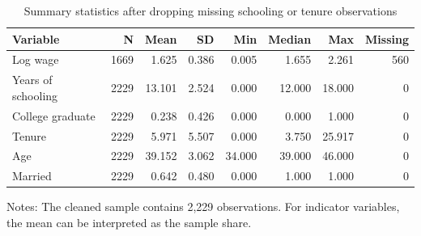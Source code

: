 \begin{table}[H]
\centering
\caption{Summary statistics after dropping missing schooling or tenure observations}
\label{tab:summary}
\begin{tabular}{lrrrrrrr}
\toprule
Variable & N & Mean & SD & Min & Median & Max & Missing \\
\midrule
Log wage & 1669 & 1.625 & 0.386 & 0.005 & 1.655 & 2.261 & 560 \\
Years of schooling & 2229 & 13.101 & 2.524 & 0.000 & 12.000 & 18.000 & 0 \\
College graduate & 2229 & 0.238 & 0.426 & 0.000 & 0.000 & 1.000 & 0 \\
Tenure & 2229 & 5.971 & 5.507 & 0.000 & 3.750 & 25.917 & 0 \\
Age & 2229 & 39.152 & 3.062 & 34.000 & 39.000 & 46.000 & 0 \\
Married & 2229 & 0.642 & 0.480 & 0.000 & 1.000 & 1.000 & 0 \\
\bottomrule
\end{tabular}
\vspace{0.15cm}
\parbox{0.92\textwidth}{\small Notes: The cleaned sample contains 2,229 observations. For indicator variables, the mean can be interpreted as the sample share.}
\end{table}
